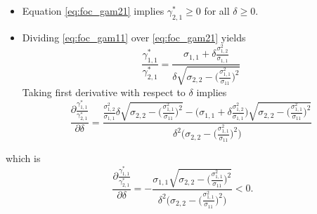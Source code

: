 \documentclass[14pt]{article}
\begin{document}
{\begin{itemize}
\item Equation \ref{eq:foc_gam21} implies $\gamma_{2,1}^* \geq 0$ for all $\delta \geq 0$.

\item Dividing \ref{eq:foc_gam11} over \ref{eq:foc_gam21} yields
$$
\frac{\gamma_{1,1}^*}{\gamma_{2,1}^*} = \frac{\sigma_{1,1} + \delta \frac{\sigma_{1,2}^2}{\sigma_{1,1}}}{\delta \sqrt{\sigma_{2,2} - \Big(\frac{\sigma_{1,1}^2}{\sigma_11}\Big)^2}} 
$$
Taking first derivative with respect to $\delta$ implies
$$
\frac{\partial \frac{\gamma_{1,1}^*}{\gamma_{2,1}^*}}{\partial \delta} = \frac{\frac{\sigma_{1,2}^2}{\sigma_{1,1}} \delta  \sqrt{\sigma_{2,2} - \Big(\frac{\sigma_{1,1}^2}{\sigma_11}\Big)^2}    - \Big( \sigma_{1,1} + \delta \frac{\sigma_{1,2}^2}{\sigma_{1,1}}  \Big)  \sqrt{\sigma_{2,2} - \Big(\frac{\sigma_{1,1}^2}{\sigma_11}\Big)^2}  }{\delta^2 \Big(   \sigma_{2,2} - \Big(\frac{\sigma_{1,1}^2}{\sigma_11}\Big)^2  \Big)}
$$ 
\end{itemize}
which is
$$
\frac{\partial \frac{\gamma_{1,1}^*}{\gamma_{2,1}^*}}{\partial \delta} = - \frac{ \sigma_{1,1}  \sqrt{\sigma_{2,2} - \Big(\frac{\sigma_{1,1}^2}{\sigma_11}\Big)^2}  }{\delta^2 \Big(   \sigma_{2,2} - \Big(\frac{\sigma_{1,1}^2}{\sigma_11}\Big)^2  \Big)} < 0.
$$ 


\

\

\

}
\end{document}
